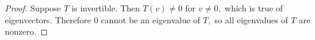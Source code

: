 \begin{proof}
    Suppose $T$ is invertible. Then $T(v)\neq 0$ for $v\neq 0,$ which is true of eigenvectors. Therefore $0$ cannot be an eigenvalue of $T,$ so all eigenvalues of $T$ are nonzero.
\end{proof}